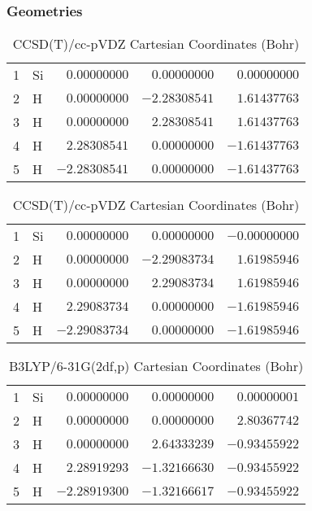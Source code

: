 \documentclass[10pt,oneside]{article}
\begin{document}
\clearpage

\subsection{}

\begin{table}[h!]
\subsubsection*{Geometries}
\begin{multicols}{2}
\centering
\caption{CCSD(T)/cc-pVTZ Cartesian Coordinates (Bohr)}
\begin{tabular}{llrrr}
\toprule
1  & Si & $ 0.00000000$ & $ 0.00000000$ & $ 0.00000000$ \\
2  & H  & $ 0.00000000$ & $-2.28308541$ & $ 1.61437763$ \\
3  & H  & $ 0.00000000$ & $ 2.28308541$ & $ 1.61437763$ \\
4  & H  & $ 2.28308541$ & $ 0.00000000$ & $-1.61437763$ \\
5  & H  & $-2.28308541$ & $ 0.00000000$ & $-1.61437763$ \\
\bottomrule
\end{tabular}
\caption{CCSD(T)/cc-pVDZ Cartesian Coordinates (Bohr)}
\begin{tabular}{llrrr}
\toprule
1  & Si & $ 0.00000000$ & $ 0.00000000$ & $-0.00000000$ \\
2  & H  & $ 0.00000000$ & $-2.29083734$ & $ 1.61985946$ \\
3  & H  & $ 0.00000000$ & $ 2.29083734$ & $ 1.61985946$ \\
4  & H  & $ 2.29083734$ & $ 0.00000000$ & $-1.61985946$ \\
5  & H  & $-2.29083734$ & $ 0.00000000$ & $-1.61985946$ \\
\bottomrule
\end{tabular}
\end{multicols}
\end{table}

\begin{table}[h]
\centering
\caption{B3LYP/6-31G(2df,p) Cartesian Coordinates (Bohr)}
\begin{tabular}{llrrr}
\toprule
1  & Si & $ 0.00000000$ & $ 0.00000000$ & $ 0.00000001$ \\
2  & H  & $ 0.00000000$ & $ 0.00000000$ & $ 2.80367742$ \\
3  & H  & $ 0.00000000$ & $ 2.64333239$ & $-0.93455922$ \\
4  & H  & $ 2.28919293$ & $-1.32166630$ & $-0.93455922$ \\
5  & H  & $-2.28919300$ & $-1.32166617$ & $-0.93455922$ \\
\bottomrule
\end{tabular}
\end{table}
\end{document}
